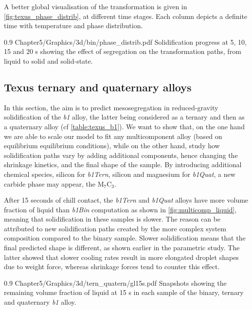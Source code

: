A better global visualisation of the transformation is given in \cref{fig:texus_phase_distrib}, at different time stages.
Each column depicts a definite time with temperature and phase distribution. 


\begin{figureth}
{0.9}
{Chapter5/Graphics/3d/bin/phase_distrib.pdf}
{Solidification progress at 5, 10, 15 and 20 s showing the effect of segregation on the transformation paths, from liquid to solid and solid-state.}
\label{fig:texus_phase_distrib}
\end{figureth}


\subsection{Texus ternary and quaternary alloys}

In this section, the aim is to predict mesosegregation in reduced-gravity solidification of the \emph{b1} alloy, the latter being considered 
as a ternary and then as a quaternary alloy (cf \cref{table:texus_b1}). 
We want to show that, on the one hand we are able to scale our model to fit any multicomponent alloy (based on equilibrium equilibrium conditions), while
on the other hand, study how solidification paths vary by adding additional components, hence changing the shrinkage kinetics, and the final shape of the sample.
By introducing additional chemical species, silicon for \emph{b1Tern}, silicon and magnesium for \emph{b1Quat}, a new carbide phase may appear, the M$_7$C$_3$.
 
After 15 seconds of chill contact, the \emph{b1Tern} and \emph{b1Quat} alloys have more volume fraction of liquid than \emph{b1Bin} computation as shown in 
\cref{fig:multicomp_liquid}, meaning that solidification in these samples is slower. 
The reason can be attributed to new solidification paths created by the more complex system composition compared  to the binary sample. 
Slower solidification means that the final predicted shape is different, as shown earlier in the parametric study.
The latter showed that slower cooling rates result in more elongated droplet shapes due to weight force, whereas shrinkage forces tend to counter this effect.

\begin{figureth}
{0.9}
{Chapter5/Graphics/3d/tern_quatern/gl15s.pdf}
{Snapshots showing the remaining volume fraction of liquid at 15 s in each sample of the binary, ternary and quaternary \emph{b1} alloy.}
\label{fig:multicomp_liquid}
\end{figureth}


